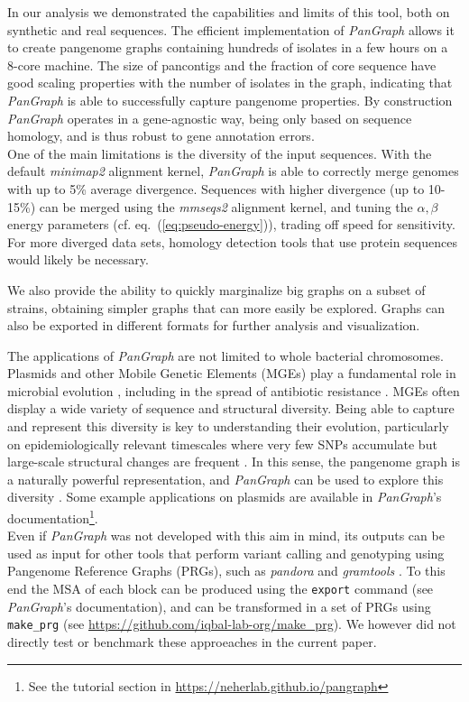 \documentclass[aps,rmp,preprint,superscriptaddress,10pt,linenumbers]{revtex4-1}
\begin{document}
In our analysis we demonstrated the capabilities and limits of this tool, both on synthetic and real sequences. The efficient implementation of \textit{PanGraph} allows it to create pangenome graphs containing hundreds of isolates in a few hours on a 8-core machine. The size of pancontigs and the fraction of core sequence have good scaling properties with the number of isolates in the graph, indicating that \textit{PanGraph} is able to successfully capture pangenome properties. By construction \textit{PanGraph} operates in a gene-agnostic way, being only based on sequence homology, and is thus robust to gene annotation errors.\\
One of the main limitations is the diversity of the input sequences. With the default \textit{minimap2} alignment kernel, \textit{PanGraph} is able to correctly merge genomes with up to 5\% average divergence. Sequences with higher divergence (up to 10-15\%) can be merged using the \textit{mmseqs2} alignment kernel, and tuning the $\alpha, \beta$ energy parameters (cf. eq.~(\ref{eq:pseudo-energy})), trading off speed for sensitivity.
For more diverged data sets, homology detection tools that use protein sequences would likely be necessary.

We also provide the ability to quickly marginalize big graphs on a subset of strains, obtaining simpler graphs that can more easily be explored. Graphs can also be exported in different formats for further analysis and visualization.

The applications of \textit{PanGraph} are not limited to whole bacterial chromosomes. Plasmids and other Mobile Genetic Elements (MGEs) play a fundamental role in microbial evolution \cite{haudiquet2022selfish,frost2005mobile}, including in the spread of antibiotic resistance \cite{van2018spread}. MGEs often display a wide variety of sequence and structural diversity. Being able to capture and represent this diversity is key to understanding their evolution, particularly on epidemiologically relevant timescales where very few SNPs accumulate but large-scale structural changes are frequent \cite{Sheppard2016, Noll2018}.
In this sense, the pangenome graph is a naturally powerful representation, and \textit{PanGraph} can be used to explore this diversity \cite{shaw_preparation}. Some example applications on plasmids are available in \textit{PanGraph}'s documentation\footnote{See the tutorial section in \url{https://neherlab.github.io/pangraph}}.\\
Even if \textit{PanGraph} was not developed with this aim in mind, its outputs can be used as input for other tools that perform variant calling and genotyping using Pangenome Reference Graphs (PRGs), such as \textit{pandora} \cite{colquhoun2021pandora} and \textit{gramtools} \cite{letcher2021gramtools}. To this end the MSA of each block can be produced using the \texttt{export} command (see \textit{PanGraph}'s documentation), and can be transformed in a set of PRGs using \texttt{make\_prg} (see \url{https://github.com/iqbal-lab-org/make_prg}). We however did not directly test or benchmark these approeaches in the current paper.\\
\end{document}
